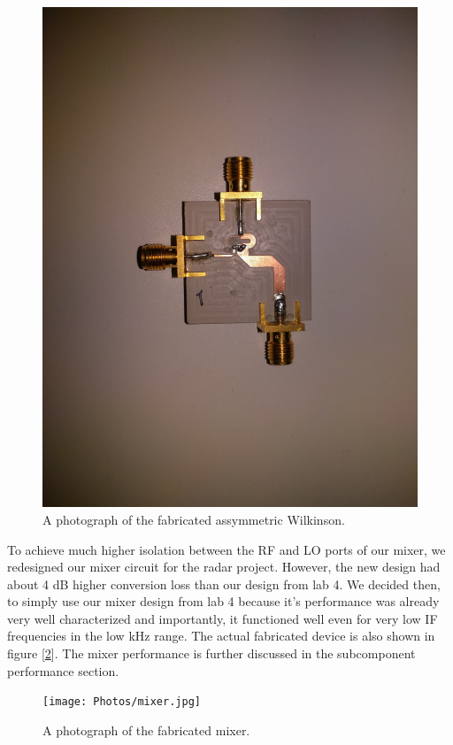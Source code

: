 \documentclass[reprint, aps, prl]{revtex4-1}
\begin{document}
\begin{figure}[!htbp]
    \centering
    \includegraphics[scale=0.05]{Photos/unbalanced.jpg}
    \caption{A photograph of the fabricated assymmetric Wilkinson.}
    \label{fig:unbalanced}
\end{figure}

To achieve much higher isolation between the RF and LO ports of our mixer, we redesigned our mixer circuit for the radar project. However, the new design had about 4 dB higher conversion loss than our design from lab 4. We decided then, to simply use our mixer design from lab 4 because it's performance was already very well characterized and importantly, it functioned well even for very low IF frequencies in the low kHz range. The actual fabricated device is also shown in figure [\ref{fig:mixer}]. The mixer performance is further discussed in the subcomponent performance section.

\begin{figure}[!htbp]
    \centering
    \texttt{[image: Photos/mixer.jpg]}
    \caption{A photograph of the fabricated mixer.}
    \label{fig:mixer}
\end{figure}
\end{document}
